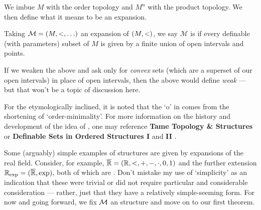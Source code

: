 We imbue $M$ with the order topology and $M^n$ with the product topology. We then define what it means to be an \om expansion.

\begin{definition}[\Om expansion]
  Taking $\mathcal{M} = (M, <, \hdots)$ an expansion of $(M, <)$, we say $\mathcal{M}$ is \om if every definable (with parameters) subset of $M$ is given by a finite union of open intervals and points.
\end{definition}

\begin{svgraybox}
  If we weaken the above and ask only for \emph{convex} sets (which are a superset of our open intervals) in place of open intervals, then the above would define \emph{weak \omy} — but that won't be a topic of discussion here.
\end{svgraybox}

For the etymologically inclined, it is noted that the `o' in \om comes from the shortening of `order-minimality'. For more information on the history and development of the idea of \omy, one may reference
\textbf{Tame Topology \& \Om Structures} \cite{dries_tame_1998} or \textbf{Definable Sets in Ordered Structures I} \cite{pillay_definable_1986} and \textbf{II} \cite{knight_definable_1986}.


Some (arguably) simple examples of \om structures are given by expansions of the real field. Consider, for example, $\overline{\mathbb{R}} = (\mathbb{R}, <, +, -, \cdot, 0, 1)$ and the further extension $\mathbb{R}_{\textrm{exp}} = (\overline{\mathbb{R}}, \exp)$, both of which are \om. Don't mistake my use of `simplicity' as an indication that these were trivial or did not require particular and considerable consideration — rather, just that they have a relatively simple-seeming form. For now and going forward, we fix $\mathcal{M}$ an \om structure and move on to our first theorem.



